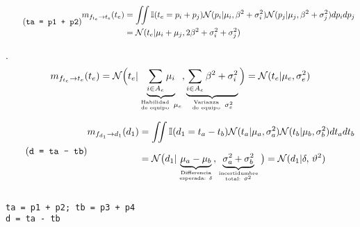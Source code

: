 \documentclass[article]{jss}
\newif\ifen
\newif\ifes
\newcommand{\en}[1]{\ifen#1\fi}
\newcommand{\es}[1]{\ifes#1\fi}
\newcommand{\N}{\mathcal{N}}
\newcommand\hfrac[2]{\genfrac{}{}{0pt}{}{#1}{#2}} %
\begin{document}
%
\en{Then, the message sent by the team factors $f_{t_e}$ to the team variable $t_e$ are,}
\es{Luego, el mensaje que envían los factores equipos $f_{t_e}$ a la variable equipo $t_e$ son,}
%
\begin{equation} \label{eq:m_ft_t} \tag{\texttt{ta = p1 + p2}}
\begin{split}
 m_{f_{t_e} \rightarrow t_e}(t_e) &= \iint \mathbb{I}(t_e = p_i + p_j) \N(p_i|\mu_i,\beta^2 + \sigma_i^2)\N(p_j|\mu_j,\beta^2 + \sigma_j^2) dp_idp_j  \\ &=  \N(t_e|\mu_i+\mu_j,2\beta^2 + \sigma_i^2 + \sigma_j^2)
\end{split}
\end{equation}
%
\en{In general (demo at annex section~\ref{suma_normales_induccion})}
\es{En general (demostraci\'on en secci\'on anexa~\ref{suma_normales_induccion})}.
%
\begin{equation*}
 m_{f_{t_e} \rightarrow t_e}(t_e) =  \N \Big( t_e | \underbrace{\sum_{i\in A_e } \mu_i}_{\hfrac{\text{Habilidad}}{\text{de equipo}} \ \mu_e}, \underbrace{\sum_{i \in A_e} \beta^2 + \sigma_i^2}_{\hfrac{\text{Varianza}}{\text{de equipo}} \ \sigma_e^2} \Big) = \N(t_e | \mu_e, \sigma_e^2)
\end{equation*}
%
\en{The message sent by the difference factor $f_{d_1}$ to the difference variable $d_1$ are,}
\es{El mensaje que envía el factor diferencia $f_{d_1}$ a la variable diferencia $d_1$ es,}
%
\begin{equation}\label{eq:m_fd_d} \tag{\texttt{d = ta - tb}}
 \begin{split} 
  m_{f_{d_1} \rightarrow d_1}(d_1) & = \iint \mathbb{I}(d_1 = t_a - t_b) \N(t_a| \mu_a, \sigma_a^2)  \N(t_b| \mu_b, \sigma_b^2)  dt_adt_b \\[0.25cm]
  & = \N\big( d_1 | \underbrace{\mu_a - \mu_b}_{\hfrac{\text{Differencia}}{\text{esperada:} \ \delta} }, \underbrace{\sigma_a^2 +\sigma_b^2}_{\hfrac{\text{incertidumbre}}{\text{total:} \ \vartheta^2}}  \big) = \N(d_1 | \delta, \, \vartheta^2)
 \end{split}
\end{equation}
\begin{lstlisting}[backgroundcolor=\color{white},label=lst:difference, caption=\relax, belowskip=-1.0 \baselineskip, aboveskip=-0.5 \baselineskip]
\end{lstlisting}
\begin{lstlisting}[backgroundcolor=\color{all}, belowskip=-0.77 \baselineskip]
ta = p1 + p2; tb = p3 + p4
d = ta - tb
\end{lstlisting}
\end{document}
